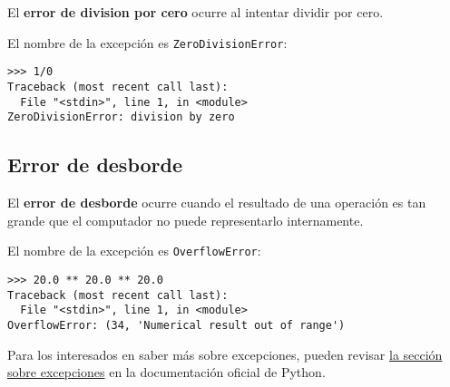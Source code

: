 El \textbf{error de division por cero} ocurre al intentar dividir por
cero.

El nombre de la excepción es \lstinline!ZeroDivisionError!:

\begin{lstlisting}
>>> 1/0
Traceback (most recent call last):
  File "<stdin>", line 1, in <module>
ZeroDivisionError: division by zero
\end{lstlisting}

\subsection{Error de desborde}

El \textbf{error de desborde} ocurre cuando el resultado de una
operación es tan grande que el computador no puede representarlo
internamente.

El nombre de la excepción es \lstinline!OverflowError!:

\begin{lstlisting}
>>> 20.0 ** 20.0 ** 20.0
Traceback (most recent call last):
  File "<stdin>", line 1, in <module>
OverflowError: (34, 'Numerical result out of range')
\end{lstlisting}

Para los interesados en saber más sobre excepciones, pueden revisar
\href{http://docs.python.org/library/exceptions.html}{la sección sobre
excepciones} en la documentación oficial de Python.
